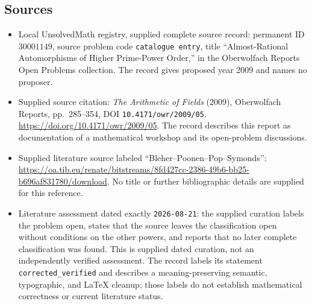 \documentclass[11pt]{article}
\begin{document}
\subsection{Sources}
\begin{itemize}
\item Local UnsolvedMath registry, supplied complete source record: permanent ID \(30001149\), source problem code \texttt{catalogue entry}, title ``Almost-Rational Automorphisms of Higher Prime-Power Order,'' in the Oberwolfach Reports Open Problems collection. The record gives proposed year 2009 and names no proposer.
\item Supplied source citation: \emph{The Arithmetic of Fields} (2009), Oberwolfach Reports, pp.~285--354, DOI \texttt{10.4171/owr/2009/05}. \url{https://doi.org/10.4171/owr/2009/05}. The record describes this report as documentation of a mathematical workshop and its open-problem discussions.
\item Supplied literature source labeled ``Bleher--Poonen--Pop--Symonds'': \url{https://oa.tib.eu/renate/bitstreams/8fd427cc-2386-49b6-bb25-b696af831780/download}. No title or further bibliographic details are supplied for this reference.
\item Literature assessment dated exactly \texttt{2026-08-21}: the supplied curation labels the problem open, states that the source leaves the classification open without conditions on the other powers, and reports that no later complete classification was found. This is supplied dated curation, not an independently verified assessment. The record labels its statement \texttt{corrected\_verified} and describes a meaning-preserving semantic, typographic, and LaTeX cleanup; those labels do not establish mathematical correctness or current literature status.
\end{itemize}
\end{document}
